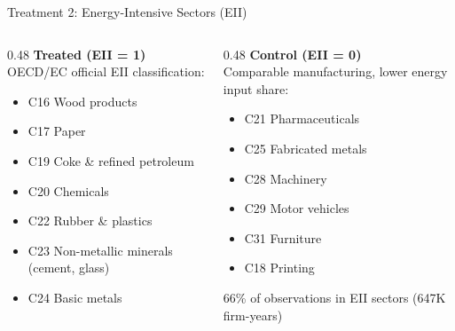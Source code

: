 \documentclass[10pt]{beamer}
\begin{document}
\begin{frame}{Treatment 2: Energy-Intensive Sectors (EII)}
  \begin{columns}[T]
    \begin{column}{0.48\textwidth}
      \textbf{Treated (EII = 1)}\\[0.3em]
      OECD/EC official EII classification:
      \begin{itemize}\small
        \item C16 Wood products
        \item C17 Paper
        \item C19 Coke \& refined petroleum
        \item C20 Chemicals
        \item C22 Rubber \& plastics
        \item C23 Non-metallic minerals (cement, glass)
        \item C24 Basic metals
      \end{itemize}
    \end{column}
    \begin{column}{0.48\textwidth}
      \textbf{Control (EII = 0)}\\[0.3em]
      Comparable manufacturing, lower energy input share:
      \begin{itemize}\small
        \item C21 Pharmaceuticals
        \item C25 Fabricated metals
        \item C28 Machinery
        \item C29 Motor vehicles
        \item C31 Furniture
        \item C18 Printing
      \end{itemize}
      \vspace{0.5em}
      \small 66\% of observations in EII sectors (647K firm-years)
    \end{column}
  \end{columns}
\end{frame}

\end{document}
